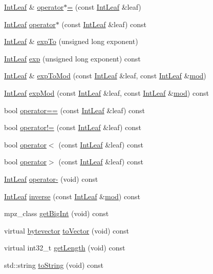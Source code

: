 \begin{DoxyCompactItemize}
\hyperlink{class_int_leaf}{Int\-Leaf} \& \hyperlink{class_int_leaf_a223e80a00ae1d5b6406202390c530350}{operator$\ast$=} (const \hyperlink{class_int_leaf}{Int\-Leaf} \&leaf)
\item 
\hyperlink{class_int_leaf}{Int\-Leaf} \hyperlink{class_int_leaf_a4c61097359b76a570a2694540fe50353}{operator$\ast$} (const \hyperlink{class_int_leaf}{Int\-Leaf} \&leaf) const 
\item 
\hyperlink{class_int_leaf}{Int\-Leaf} \& \hyperlink{class_int_leaf_a4f3e611a11145013b51d60858ef92d27}{exp\-To} (unsigned long exponent)
\item 
\hyperlink{class_int_leaf}{Int\-Leaf} \hyperlink{class_int_leaf_ad0c837ec28fe24e02e61f252b5f984ea}{exp} (unsigned long exponent) const 
\item 
\hyperlink{class_int_leaf}{Int\-Leaf} \& \hyperlink{class_int_leaf_a27195b157fbfc3610c805319d45ebbed}{exp\-To\-Mod} (const \hyperlink{class_int_leaf}{Int\-Leaf} \&leaf, const \hyperlink{class_int_leaf}{Int\-Leaf} \&\hyperlink{class_int_leaf_a4e645145141d0f8ded8afdd2c6aa7228}{mod})
\item 
\hyperlink{class_int_leaf}{Int\-Leaf} \hyperlink{class_int_leaf_ab9be4f972ddaa79d5482b2f037476ea8}{exp\-Mod} (const \hyperlink{class_int_leaf}{Int\-Leaf} \&leaf, const \hyperlink{class_int_leaf}{Int\-Leaf} \&\hyperlink{class_int_leaf_a4e645145141d0f8ded8afdd2c6aa7228}{mod}) const 
\item 
bool \hyperlink{class_int_leaf_a315436fad53849eb1701b665c12d3682}{operator==} (const \hyperlink{class_int_leaf}{Int\-Leaf} \&leaf) const 
\item 
bool \hyperlink{class_int_leaf_adf2a7f85887432129ae1a6fd200ebcbb}{operator!=} (const \hyperlink{class_int_leaf}{Int\-Leaf} \&leaf) const 
\item 
bool \hyperlink{class_int_leaf_ae62d5927bd7b6b91961b8cd0f9a25873}{operator$<$} (const \hyperlink{class_int_leaf}{Int\-Leaf} \&leaf) const 
\item 
bool \hyperlink{class_int_leaf_a1ad7269c9e92c87612f81bb665a973f9}{operator$>$} (const \hyperlink{class_int_leaf}{Int\-Leaf} \&leaf) const 
\item 
\hyperlink{class_int_leaf}{Int\-Leaf} \hyperlink{class_int_leaf_ad12dc34eca055a28ecfb6ea469d4e887}{operator-\/} (void) const 
\item 
\hyperlink{class_int_leaf}{Int\-Leaf} \hyperlink{class_int_leaf_ab27881e338fb850a3cb59fd3e502339e}{inverse} (const \hyperlink{class_int_leaf}{Int\-Leaf} \&\hyperlink{class_int_leaf_a4e645145141d0f8ded8afdd2c6aa7228}{mod}) const 
\item 
mpz\-\_\-class \hyperlink{class_int_leaf_a519d2f9d31a01c3e90d898156631b7a2}{get\-Big\-Int} (void) const 
\item 
virtual \hyperlink{types_8h_a64b5be62be31dcda165d2c6c3c262fb5}{bytevector} \hyperlink{class_int_leaf_a1817ac7916ab1c4ff09717db0a6d95f2}{to\-Vector} (void) const 
\item 
virtual int32\-\_\-t \hyperlink{class_int_leaf_a92719f80a7410d76e4fae51de9b28e36}{get\-Length} (void) const 
\item 
std\-::string \hyperlink{class_int_leaf_ad816e278b0955fd58bbbb1669b8d6885}{to\-String} (void) const 
\end{DoxyCompactItemize}
